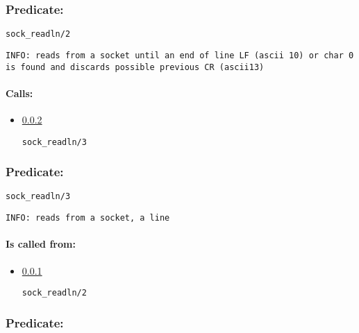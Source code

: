 \subsubsection{Predicate:} \label{sockV95WreadlnV95W2}

\begin{verbatim}
sock_readln/2
\end{verbatim}

{\small \begin{verbatim}
INFO: reads from a socket until an end of line LF (ascii 10) or char 0 is found and discards possible previous CR (ascii13)

\end{verbatim}}
\paragraph{Calls:} 
\begin{itemize}
\item \ref{sockV95WreadlnV95W3} 
\begin{verbatim}
sock_readln/3
\end{verbatim}

\end{itemize}

\subsubsection{Predicate:} \label{sockV95WreadlnV95W3}

\begin{verbatim}
sock_readln/3
\end{verbatim}

{\small \begin{verbatim}
INFO: reads from a socket, a line

\end{verbatim}}
\paragraph{Is called from:} 
\begin{itemize}
\item \ref{sockV95WreadlnV95W2} 
\begin{verbatim}
sock_readln/2
\end{verbatim}

\end{itemize}

\subsubsection{Predicate:} \label{sockV95WwriteV95W2}

